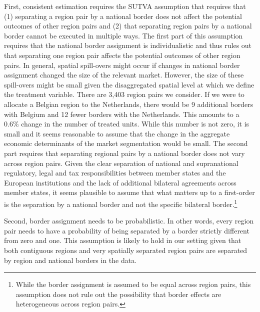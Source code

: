 First, consistent estimation requires the SUTVA assumption that requires that (1) separating a region pair by a national border does not affect the potential outcomes of other region pairs and (2) that separating region pairs by a national border cannot be executed in multiple ways. The first part of this assumption requires that the national border assignment is individualistic and thus rules out that separating one region pair affects the potential outcomes of other region pairs. In general, spatial spill-overs might occur if changes in national border assignment changed the size of the relevant market. However, the size of these spill-overs might be small given the disaggregated spatial level at which we define the treatment variable. There are 3,403 region pairs we consider. If we were to allocate a Belgian region to the Netherlands, there would be 9 additional borders with Belgium and 12 fewer borders with the Netherlands. This amounts to a 0.6\% change in the number of treated units. While this number is not zero, it is small and it seems reasonable to assume that the change in the aggregate economic determinants of the market segmentation would be small. The second part requires that separating regional pairs by a national border does not vary across region pairs. Given the clear separation of national and supranational regulatory, legal and tax responsibilities between member states and the European institutions and the lack of additional bilateral agreements across member states, it seems plausible to assume that what matters up to a first-order is the separation by a national border and not the specific bilateral border.\footnote{While the border assignment is assumed to be equal across region pairs, this assumption does not rule out the possibility that border effects are heterogeneous across region pairs.}

Second, border assignment needs to be probabilistic. In other words, every region pair needs to have a probability of being separated by a border strictly different from zero and one. This assumption is likely to hold in our setting given that both contiguous regions and very spatially separated region pairs are separated by region and national borders in the data.

